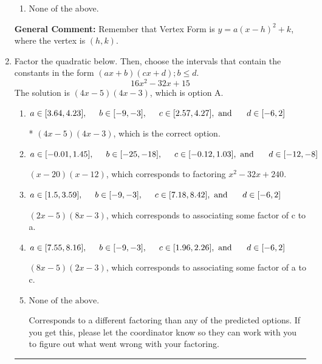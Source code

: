 \documentclass{extbook}[14pt]
\newcommand{\litem}[1]{\item #1

\rule{\textwidth}{0.4pt}}
\begin{document}
\begin{enumerate}
{\begin{enumerate}[label=\Alph*.]
\begin{multicols}{2}
\end{multicols}\item None of the above.\end{enumerate}
\textbf{General Comment:} Remember that Vertex Form is $y = a(x-h)^2+k$, where the vertex is $(h, k)$.
}
\litem{
Factor the quadratic below. Then, choose the intervals that contain the constants in the form $(ax+b)(cx+d); b \leq d.$
\[ 16x^{2} -32 x + 15 \]
The solution is \( (4x -5)(4x -3) \), which is option A.\begin{enumerate}[label=\Alph*.]
\item \( a \in [3.64, 4.23], \hspace*{5mm} b \in [-9, -3], \hspace*{5mm} c \in [2.57, 4.27], \text{ and } \hspace*{5mm} d \in [-6, 2] \)

* $(4x -5)(4x -3)$, which is the correct option.
\item \( a \in [-0.01, 1.45], \hspace*{5mm} b \in [-25, -18], \hspace*{5mm} c \in [-0.12, 1.03], \text{ and } \hspace*{5mm} d \in [-12, -8] \)

 $(x -20)(x -12)$, which corresponds to factoring $x^{2} -32 x + 240$.
\item \( a \in [1.5, 3.59], \hspace*{5mm} b \in [-9, -3], \hspace*{5mm} c \in [7.18, 8.42], \text{ and } \hspace*{5mm} d \in [-6, 2] \)

 $(2x -5)(8x -3)$, which corresponds to associating some factor of c to a.
\item \( a \in [7.55, 8.16], \hspace*{5mm} b \in [-9, -3], \hspace*{5mm} c \in [1.96, 2.26], \text{ and } \hspace*{5mm} d \in [-6, 2] \)

 $(8x -5)(2x -3)$, which corresponds to associating some factor of a to c.
\item \( \text{None of the above.} \)

 Corresponds to a different factoring than any of the predicted options. If you get this, please let the coordinator know so they can work with you to figure out what went wrong with your factoring.
\end{enumerate}

}
\end{enumerate}
\end{document}

